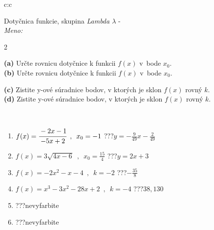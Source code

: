 \documentclass[10pt]{report}
\begin{document}
\begin{tabular}{c:c}
\begin{minipage}[c][104.5mm][t]{0.5\linewidth}
\begin{center}
\vspace{7mm}
{\huge Dotyčnica funkcie, skupina \textit{Lambda $\lambda$} -}\\[5mm]
\textit{Meno:}\phantom{xxxxxxxxxxxxxxxxxxxxxxxxxxxxxxxxxxxxxxxxxxxxxxxxxxxxxxxxxxxxxxxxx}\\[5mm]
\begin{minipage}{0.95\linewidth}
\begin{center}
{\small \begin{multicols}{2} \raggedright
\textbf{(a)} Určte rovnicu dotyčnice k funkcii \(f(x)\) v~bode \(x_0\). \\[1mm]
\textbf{(b)} Určte rovnicu dotyčnice k funkcii \(f(x)\) v~bode \(x_0\). \par \columnbreak
\textbf{(c)} Zistite y-ové súradnice bodov, v ktorých je sklon \(f(x)\) rovný \(k\). \\[1mm]
\textbf{(d)} Zistite y-ové súradnice bodov, v ktorých je sklon \(f(x)\) rovný \(k\). \\[1mm]
\end{multicols}
}
\end{center}
\end{minipage}
\\[4mm]
\begin{minipage}{0.79\linewidth}
\begin{center}
\begin{varwidth}{\linewidth}
\begin{enumerate}
\normalsizerr
\item $f(x)=\cfrac{-2x-1}{-5x+2}\enspace , \enspace x_0=-1$\quad \dotfill\; ???\;\dotfill \quad $y = -\frac{9}{49}x-\frac{2}{49}$
\item $f(x)=3\sqrt{4x-6}\enspace , \enspace x_0=\frac{15}{4}$\quad \dotfill\; ???\;\dotfill \quad $y = 2x+3$
\item $f(x)=-2x^2-x-4\enspace , \enspace k=-2$\quad \dotfill\; ???\;\dotfill \quad $-\frac{35}{8}$
\item $f(x)=x^3-3x^2-28x+2\enspace , \enspace k=-4$\quad \dotfill\; ???\;\dotfill \quad $38 , 130$
\item \quad \dotfill\; ???\;\dotfill \quad nevyfarbite
\item \quad \dotfill\; ???\;\dotfill \quad nevyfarbite
\end{enumerate}
\end{varwidth}

\end{center}
\end{minipage}
\end{center}
\end{minipage}
\end{tabular}
\end{document}
